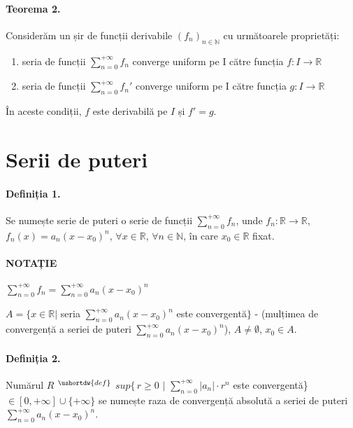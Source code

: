 \paragraph{Teorema 2.}
Considerăm un șir de funcții derivabile $(f_{n})_{n \in \mathbb{N}}$ cu următoarele proprietăți:
\begin{enumerate}[label=\emph{\alph*})]
	\item seria de funcții $\displaystyle\sum_{n=0}^{+\infty}f_{n}$ converge uniform pe I către funcția $f:I \rightarrow \mathbb{R}$
	\item seria de funcții $\displaystyle\sum_{n=0}^{+\infty}f_{n}'$ converge uniform pe I către funcția $g:I \rightarrow \mathbb{R}$
\end{enumerate}

În aceste condiții, $f$ este derivabilă pe $I$ și $f' = g$.

\section{Serii de puteri}
\paragraph{Definiția 1.}
Se numește serie de puteri o serie de funcții $\displaystyle\sum_{n=0}^{+\infty}f_{n}$, unde $f_{n}:\mathbb{R} \rightarrow \mathbb{R}$, $f_{n}(x) = a_{n} (x-x_{0})^{n}$,
$\forall x \in \mathbb{R}$, $\forall n \in \mathbb{N}$, în care $x_{0} \in \mathbb{R}$ fixat.

\paragraph*{NOTAȚIE}
$\displaystyle\sum_{n=0}^{+\infty}f_{n} = \displaystyle\sum_{n=0}^{+\infty}a_{n}(x-x_{0})^{n}$ 

$A = \{x \in \mathbb{R} \vert$ seria $\displaystyle\sum_{n=0}^{+\infty}a_{n}(x-x_{0})^{n}$ este convergentă$\}$
- (mulțimea de convergență a seriei de puteri
$\displaystyle\sum_{n=0}^{+\infty}a_{n}(x-x_{0})^{n}$), $A \neq
\emptyset$, $x_{0} \in A$.

\paragraph{Definiția 2.}
Numărul $R$ $^{\ushortdw{def}}$ $sup$$\{ \, r \geq 0$ $\vert$ $\displaystyle\sum_{n=0}^{+\infty} \lvert a_{n} \rvert \cdot r^{n}$ este convergentă\} $\in [0, +\infty] \cup \{+\infty\}$
se numește raza de convergență absolută a seriei de puteri $\displaystyle\sum_{n=0}^{+\infty}a_{n}(x-x_{0})^{n}$. 

